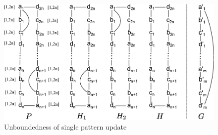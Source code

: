 \begin{figure}[tb!]
\label{fig-inc-complexity-pattern}
\begin{center}
\includegraphics[scale=0.3]{./fig/inc-complexity-proof-pattern.eps}
\end{center}
\vspace{-3ex}
\caption{Unboundedness of single pattern update}
\vspace{-5ex}
\end{figure}

